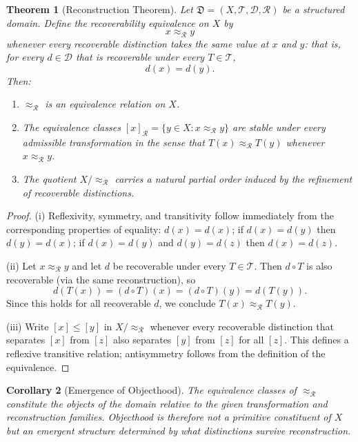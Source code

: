 \documentclass[12pt,oneside]{article}
\newtheorem{theorem}{Theorem}[section] \newtheorem{lemma}[theorem]{Lemma} \newtheorem{proposition}[theorem]{Proposition} \newtheorem{corollary}[theorem]{Corollary}
\theoremstyle{definition}
\begin{document}
\begin{theorem}[Reconstruction Theorem]

Let \(\mathfrak{D} = (X, \mathcal{T}, \mathcal{D}, \mathcal{R})\) be a structured domain. Define the \emph{recoverability equivalence} on \(X\) by
\[
x \approx_{\mathcal{R}} y
\]
whenever every recoverable distinction takes the same value at \(x\) and \(y\): that is, for every \(d \in \mathcal{D}\) that is recoverable under every \(T \in \mathcal{T}\),
\[
d(x) = d(y).
\]
Then:
\begin{enumerate}
\item[(i)] \(\approx_{\mathcal{R}}\) is an equivalence relation on \(X\).
\item[(ii)] The equivalence classes \([x]_{\mathcal{R}} = \{y \in X : x \approx_{\mathcal{R}} y\}\) are stable under every admissible transformation in the sense that \(T(x) \approx_{\mathcal{R}} T(y)\) whenever \(x \approx_{\mathcal{R}} y\).
\item[(iii)] The quotient \(X / {\approx_{\mathcal{R}}}\) carries a natural partial order induced by the refinement of recoverable distinctions.
\end{enumerate}

\end{theorem}

\begin{proof}

(i) Reflexivity, symmetry, and transitivity follow immediately from the corresponding properties of equality: $d(x) = d(x)$; if $d(x) = d(y)$ then $d(y) = d(x)$; if $d(x) = d(y)$ and $d(y) = d(z)$ then $d(x) = d(z)$.

(ii) Let $x \approx_{\mathcal{R}} y$ and let $d$ be recoverable under every $T \in \mathcal{T}$. Then $d \circ T$ is also recoverable (via the same reconstruction), so
\[
d(T(x)) = (d \circ T)(x) = (d \circ T)(y) = d(T(y)).
\]
Since this holds for all recoverable $d$, we conclude $T(x) \approx_{\mathcal{R}} T(y)$.

(iii) Write $[x] \leq [y]$ in $X / {\approx_{\mathcal{R}}}$ whenever every recoverable distinction that separates $[x]$ from $[z]$ also separates $[y]$ from $[z]$ for all $[z]$. This defines a reflexive transitive relation; antisymmetry follows from the definition of the equivalence.

\end{proof}

\begin{corollary}[Emergence of Objecthood]

The equivalence classes of \(\approx_{\mathcal{R}}\) constitute the objects of the domain relative to the given transformation and reconstruction families. Objecthood is therefore not a primitive constituent of \(X\) but an emergent structure determined by what distinctions survive reconstruction.

\end{corollary}
\end{document}
